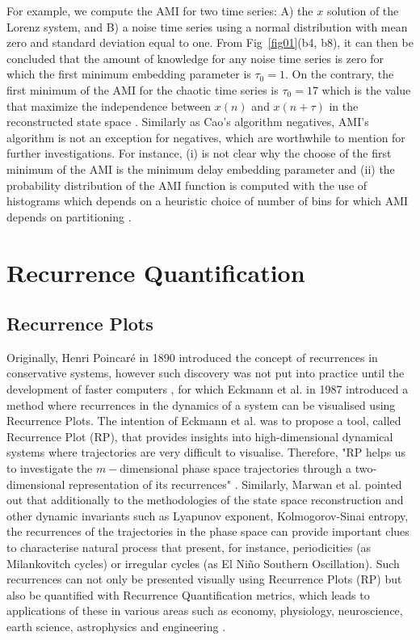 \documentclass[fleqn,10pt]{wlscirep}
\begin{document}
For example, we compute the AMI for two time series: A) the $x$ solution of the Lorenz system, and B) a noise time series using a normal distribution with mean zero and standard deviation equal to one.
From Fig~\ref{fig01}(b4, b8), it can then be concluded that the amount of knowledge for any noise time series is zero for which the first minimum embedding parameter is $\tau_0=1$.
On the contrary, the first minimum of the AMI for the chaotic time series is $\tau_0=17$ which is the value that maximize the independence between $x(n)$ and $x(n+\tau)$ in the reconstructed state space \cite{bradley2015}.
Similarly as Cao's algorithm negatives, AMI's algorithm is not an exception for negatives, which are worthwhile to mention for further investigations.
For instance, (i) is not clear why the choose of the first minimum of the AMI is the minimum delay embedding parameter \cite{kantz2003} and (ii) the probability distribution of the AMI function is computed with the use of histograms which depends on a heuristic choice of number of bins for which AMI depends on partitioning \cite{garcia2005e71}.

\section*{Recurrence Quantification}\label{sec:recurrence-quantification}
\subsection*{Recurrence Plots}
Originally, Henri Poincar\'e in 1890 introduced the concept of recurrences in conservative systems, however such discovery was not put into practice until the development of faster computers \cite{marwan2007}, for which Eckmann et al. \cite{eckmann1987} in 1987 introduced a method where recurrences in the dynamics of a system can be visualised using
Recurrence Plots. The intention of Eckmann et al. \cite{eckmann1987} was to propose a tool, called Recurrence Plot (RP), that provides insights into high-dimensional dynamical systems where trajectories are very difficult to visualise.
Therefore, "RP helps us to investigate the $m-$dimensional phase space trajectories through a two-dimensional representation of its recurrences" \cite{marwan2015}.
Similarly, Marwan et al. \cite{marwan2015} pointed out that additionally to the methodologies of the state space reconstruction and other dynamic invariants such as Lyapunov exponent, Kolmogorov-Sinai entropy, the recurrences of the trajectories in the phase space can provide important clues to characterise natural process that present, for instance, periodicities (as Milankovitch cycles) or irregular cycles (as El Ni\~no Southern Oscillation).
Such recurrences can not only be presented visually using Recurrence Plots (RP) but also be quantified with Recurrence Quantification metrics, which leads to applications of these in various areas such as economy, physiology, neuroscience, earth science, astrophysics and engineering \cite{marwan2007}.
\end{document}
